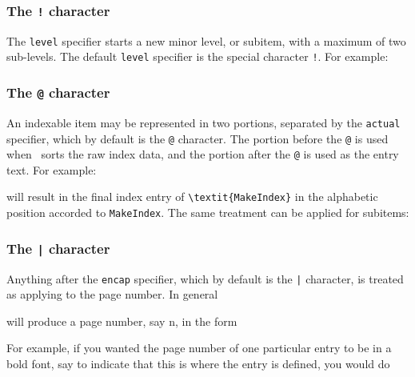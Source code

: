 {\subsubsection{The \texttt{!} character}

    The \texttt{level} specifier starts a new minor level, or subitem,
with a maximum of two sub-levels. The default \texttt{level} specifier
is the special character \texttt{!}. For example:
\begin{lcode}
\end{lcode}

\subsubsection{The \texttt{@} character}

    An indexable item may be represented in two portions, separated
by the \texttt{actual} specifier, which by default is the
\texttt{@} character. 
The portion before the \texttt{@} is used
when \Lmakeindex\ sorts the raw index data, and the portion after
the \texttt{@} is used as the entry text. For example:
\begin{lcode}
\end{lcode}
will result in the final index entry of \verb?\textit{MakeIndex}? in the 
alphabetic position accorded to \verb?MakeIndex?. 
The same treatment can be applied for subitems:
\begin{lcode}
\end{lcode}

\subsubsection{The \texttt{|} character}

    Anything after the \texttt{encap} specifier, which by default
is the \texttt{|} character, 
is treated as applying to the page number. In general
\begin{lcode}
\end{lcode}
will produce a page number, say n, in the form
\begin{lcode}
\end{lcode}
For example, if you wanted the page number of one particular entry
to be in a bold font, say to indicate that this is where the entry
is defined, you would do
\begin{lcode}
\end{lcode}

}
